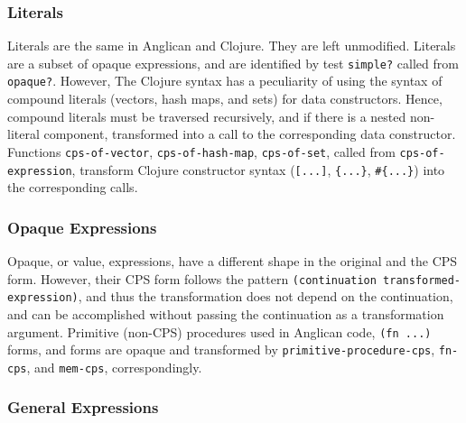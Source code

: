 \documentclass[preprint]{sigplanconf}
\begin{document}
\subsubsection{Literals}

Literals are the same in Anglican and Clojure. They are 
left unmodified. Literals are a subset of opaque expressions,
and are identified by test \texttt{simple?} called from
\texttt{opaque?}.  However, The Clojure syntax has a peculiarity
of using the syntax of compound literals (vectors, hash maps,
and sets) for data constructors. Hence, compound literals must
be traversed recursively, and if there is a nested non-literal
component, transformed into a call to the corresponding data
constructor. Functions \texttt{cps-of-vector},
\texttt{cps-of-hash-map}, \texttt{cps-of-set}, called from
\texttt{cps-of-expression}, transform Clojure constructor syntax
(\texttt{[...]}, \texttt{\{...\}}, \texttt{\#\{...\}}) into the
corresponding calls.

\subsubsection{Opaque Expressions}

Opaque, or value, expressions, have a different shape in the
original and the CPS form. However, their CPS form follows the
pattern \texttt{(continuation transformed-expression)}, and thus
the transformation does not depend on the continuation, and
can be accomplished without passing the continuation as a
transformation argument. Primitive (non-CPS) procedures used in
Anglican code, \texttt{(fn ...)} forms, and 
forms are opaque and transformed by
\texttt{primitive-}\linebreak[0]\texttt{procedure-}\linebreak[0]\texttt{cps}, \texttt{fn-cps}, and
\texttt{mem-cps}, correspondingly.

\subsubsection{General Expressions}
\end{document}
